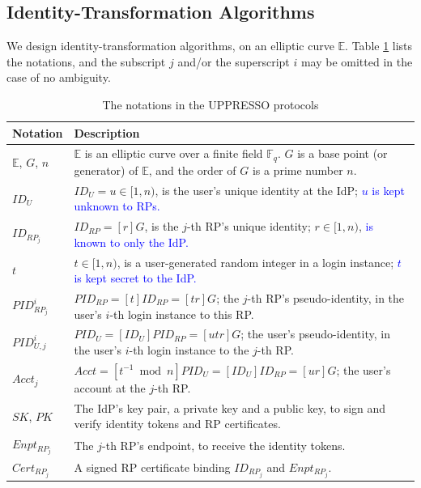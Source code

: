 
\subsection{Identity-Transformation Algorithms}
\label{subsec:overview}

We design identity-transformation algorithms,
    on an elliptic curve $\mathbb{E}$.
Table \ref{tbl:notations-protocol} lists the notations,
    and the subscript $j$ and/or the superscript $i$ may be omitted in the case of no ambiguity.

\begin{table}[tb]
\footnotesize
    \caption{The notations in the UPPRESSO protocols}
    \centering
    \begin{tabular}{|p{1.0cm}|p{6.60cm}|} \hline
    {\textbf{Notation}} & {\textbf{Description}} \\ \hline
    {$\mathbb{E}$, $G$, $n$} & {$\mathbb{E}$ is an elliptic curve over a finite field $\mathbb{F}_q$. $G$ is a base point (or generator) of $\mathbb{E}$, and the order of $G$ is a prime number $n$.} \\ \hline
    {$ID_U$} & {$ID_U = u \in [1, n)$, is the user's unique identity at the IdP; \textcolor{blue}{$u$ is kept unknown to RPs.}} \\ \hline
   {$ID_{RP_j}$} & {$ID_{RP} = [r]G$, is the $j$-th RP's unique identity; $r \in [1, n)$, \textcolor{blue}{is known to only the IdP.}} \\ \hline
    {$t$} & {$t \in [1, n)$, is a user-generated random integer in a login instance; \textcolor{blue}{$t$ is kept secret to the IdP.}} \\ \hline
    {$PID_{RP_j}^i$} & {$PID_{RP} = [t]{ID_{RP}} = [tr]G$; the $j$-th RP's pseudo-identity, in the user's $i$-th login instance to this RP.} \\ \hline
    {$PID_{U,j}^i$} & {$PID_U = [{ID_U}]{PID_{RP}} = [utr]G$; the user's pseudo-identity, in the user's $i$-th login instance to the $j$-th RP.} \\ \hline
     {$Acct_j$} & {$Acct = [t^{-1}\bmod n]PID_{U} = [ID_U]ID_{RP} = [ur]G$; the user's account at the $j$-th RP.} \\ \hline
    {$SK$, $PK$} & {The IdP's key pair, a private key and a public key, to sign and verify identity tokens and RP certificates.} \\ \hline
    {$Enpt_{RP_j}$} & {The $j$-th RP's endpoint, to receive the identity tokens.} \\ \hline
    {$Cert_{RP_j}$} & {A signed RP certificate binding $ID_{RP_j}$ and $Enpt_{RP_j}$.} \\ \hline
    \end{tabular}
    \label{tbl:notations-protocol}
\end{table}


